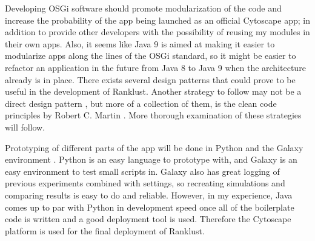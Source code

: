 \documentclass[UKenglish,11pt,a4paper]{article}
\begin{document}
Developing OSGi software should promote modularization \cite{modularization} %
of the code and increase the probability of the app being launched as an official Cytoscape app; in addition to provide
other developers with the possibility of reusing my modules in their own apps. Also, it seems like Java 9 is aimed
at making it easier to modularize apps along the lines of the OSGi standard, so it might be easier to refactor an
application in the future from Java 8 to Java 9 when the architecture already is in place. There exists several design 
patterns that could prove to be useful in the development of Ranklust. Another strategy to follow may not be a direct 
design pattern \cite{designpattern}, but more of a collection of them, is the clean code principles by Robert C. Martin 
\cite{cleancode}. More thorough examination of these strategies will follow. 

Prototyping of different parts of the app will be done in Python and the Galaxy environment \cite{galaxy}. Python is an 
easy language to prototype with, and Galaxy is an easy environment to test small scripts in. Galaxy also has great 
logging of previous experiments combined with settings, so recreating simulations and comparing results is easy to do and
reliable. However, in my experience, Java comes up to par with Python in development speed once all of the boilerplate
code is written and a good deployment tool is used. Therefore the Cytoscape platform is used for the final deployment of
Ranklust.

\printbibliography
\end{document}
